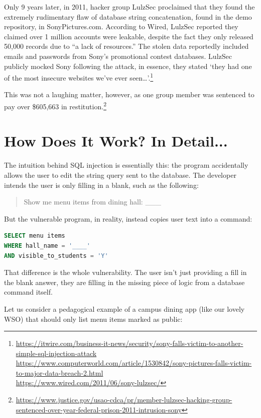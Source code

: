 \documentclass[12pt]{article}
\begin{document}
Only 9 years later, in 2011, hacker group LulzSec proclaimed that they found the extremely rudimentary flaw of database string concatenation, found in the demo repository, in SonyPictures.com. According to Wired, LulzSec reported they claimed over 1 million accounts were leakable, despite the fact they only released 50,000 records due to “a lack of resources.” The stolen data reportedly included emails and passwords from Sony’s promotional contest databases. LulzSec publicly mocked Sony following the attack, in essence, they stated ‘they had one of the most insecure websites we’ve ever seen…’.\footnote{
\url{https://itwire.com/business-it-news/security/sony-falls-victim-to-another-simple-sql-injection-attack}
\\
\url{https://www.computerworld.com/article/1530842/sony-pictures-falls-victim-to-major-data-breach-2.html}
\\
\url{https://www.wired.com/2011/06/sony-lulzsec/}
}

This was not a laughing matter, however, as one group member was sentenced to pay over \$605,663 in restitution.\footnote{\url{https://www.justice.gov/usao-cdca/pr/member-lulzsec-hacking-group-sentenced-over-year-federal-prison-2011-intrusion-sony}}


\section{How Does It Work? In Detail...}

The intuition behind SQL injection is essentially this: the program accidentally allows the user to edit the string query sent to the database. The developer intends the user is only filling in a blank, such as the following:

\begin{quote}
Show me menu items from dining hall: \_\_\_
\end{quote}

But the vulnerable program, in reality, instead copies user text into a command:

\begin{lstlisting}[language=SQL]
SELECT menu items
WHERE hall_name = '____'
AND visible_to_students = 'Y'
\end{lstlisting}

That difference is the whole vulnerability. The user isn’t just providing a fill in the blank answer, they are filling in the missing piece of logic from a database command itself.

Let us consider a pedagogical example of a campus dining app (like our lovely WSO) that should only list menu items marked as public:
\end{document}
